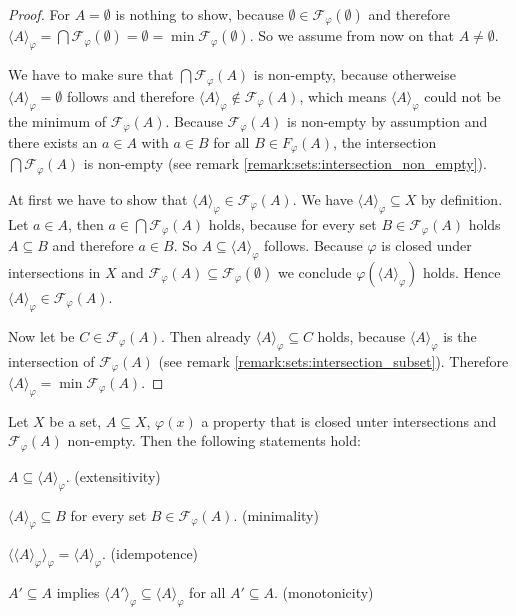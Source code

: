 \begin{proof}
    For $A=\emptyset$ is nothing to show, because $\emptyset\in\mathcal F_\varphi(\emptyset)$ and therefore $\langle A\rangle_\varphi=\bigcap\mathcal F_\varphi(\emptyset)=\emptyset=\min\mathcal F_\varphi(\emptyset)$. So we assume from now on that $A\neq\emptyset$.

    We have to make sure that $\bigcap\mathcal F_\varphi(A)$ is non-empty, because otherweise $\langle A\rangle_\varphi=\emptyset$ follows and therefore $\langle A\rangle_\varphi\notin \mathcal F_\varphi(A)$, which means $\langle A\rangle_\varphi$ could not be the minimum of $\mathcal F_\varphi(A)$. Because $\mathcal F_\varphi(A)$ is non-empty by assumption and there exists an $a\in A$ with $a\in B$ for all $B\in F_\varphi(A)$, the intersection $\bigcap\mathcal F_\varphi(A)$ is non-empty (see remark \ref{remark:sets:intersection_non_empty}).

    At first we have to show that $\langle A\rangle_\varphi\in \mathcal F_\varphi(A)$. We have $\langle A\rangle_\varphi\subseteq X$ by definition. Let $a\in A$, then $a\in \bigcap \mathcal F_\varphi(A)$ holds, because for every set $B\in\mathcal F_\varphi(A)$ holds $A\subseteq B$ and therefore $a\in B$. So $A\subseteq\langle A\rangle_\varphi$ follows. Because $\varphi$ is closed under intersections in $X$ and $\mathcal F_\varphi(A)\subseteq \mathcal F_\varphi(\emptyset)$ we conclude $\varphi(\langle A\rangle_\varphi)$ holds. Hence $\langle A\rangle_\varphi\in\mathcal F_\varphi(A)$.

    Now let be $C\in\mathcal F_\varphi(A)$. Then already $\langle A\rangle_\varphi\subseteq C$ holds, because $\langle A\rangle_\varphi$ is the intersection of $\mathcal F_\varphi(A)$ (see remark \ref{remark:sets:intersection_subset}). Therefore $\langle A\rangle_{\varphi}=\min\mathcal F_\varphi(A)$.
\end{proof}

\begin{theorem}\label{theorem:relations:closure_properties}
    Let $X$ be a set, $A\subseteq X$, $\varphi(x)$ a property that is closed unter intersections and $\mathcal F_\varphi(A)$ non-empty. Then the following statements hold:
    \begin{intheoremenumerate}
        \item $A\subseteq\langle A\rangle_\varphi$. (extensitivity)
        \item $\langle A\rangle_\varphi\subseteq B$ for every set $B\in\mathcal F_\varphi(A)$. (minimality)
        \item $\langle \langle A\rangle_\varphi\rangle_\varphi=\langle A\rangle_\varphi$. (idempotence)
        \item $A'\subseteq A$ implies $\langle A'\rangle_\varphi\subseteq\langle A\rangle_\varphi$ for all $A'\subseteq A$. (monotonicity)
    \end{intheoremenumerate}
\end{theorem}

